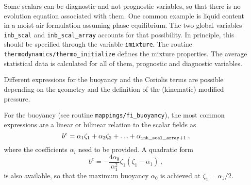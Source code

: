 Some scalars can be diagnostic and not prognostic variables, so that there is no evolution equation associated with them. One common example is liquid content in a moist air formulation assuming phase equilibrium. The two global variables {\tt inb\_scal} and {\tt inb\_scal\_array} accounts for that possibility. In principle, this should be specified through the variable {\tt imixture}. The routine {\tt thermodynamics/thermo\_initialize} defines the mixture properties. The average statistical data is calculated for all of them, prognostic and diagnostic variables.

Different expressions for the buoyancy and the Coriolis terms are possible depending on the geometry and the definition of the (kinematic) modified pressure.

For the buoyancy (see routine {\tt mappings/fi\_buoyancy}), the most common expressions are a linear or bilinear relation to the scalar fields as
\begin{equation}
  b^e=\alpha_1\zeta_1+\alpha_2\zeta_2+\ldots+\alpha_\mathrm{\tt inb\_scal\_array+1}\;,
\end{equation}
where the coefficients $\alpha_i$ need to be provided. A quadratic form
\begin{equation}
  b^e=-\frac{4\alpha_0}{\alpha_1^2}\zeta_1(\zeta_1-\alpha_1) \;,
\end{equation}
is also available, so that the maximum buoyancy $\alpha_0$ is achieved at
$\zeta_1=\alpha_1/2$.

